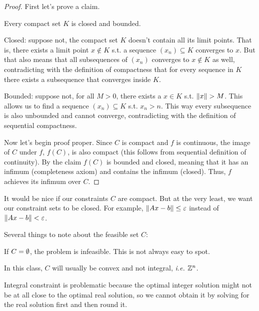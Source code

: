 \documentclass[class=article,crop=false]{standalone}
\begin{document}
\begin{proof}
	First let's prove a claim.
	\begin{claim}
		Every compact set $ K$ is closed and bounded. 
	\end{claim}

	Closed: suppose not, the compact set $ K$ doesn't contain all its limit points. That is, there exists a limit point $ x \not\in K$ s.t. a sequence  $ (x_n) \subseteq K$ converges to $ x$. But that also means that all subsequences of $ (x_n)$ converges to $ x \not\in K$ as well, contradicting with the definition of compactness that for every sequence in $ K$ there exists a subsequence that converges inside $ K$. 

	Bounded: suppose not, for all $ M > 0$, there exists a  $ x \in K$ s.t. $ {\left\lVert{ x}\right\rVert} > M $. This allows us to find a sequence $ (x_n) \subseteq K$ s.t. $ x_n > n$. This way every subsequence is also unbounded and cannot converge, contradicting with the definition of sequential compactness.
	
	Now let's begin proof proper. Since $ C$ is compact and  $ f$ is continuous, the image of  $ C$ under  $ f$,  $ f(C)$, is also compact (this follows from sequential definition of continuity). By the claim $f(C) $ is bounded and closed, meaning that it has an infimum (completeness axiom) and contains the infimum (closed). Thus, $ f$ achieves its infimum over $ C$.
\end{proof}
\begin{remark}
It would be nice if our constraints $ C$ are compact. But at the very least, we want our constraint sets to be closed. For example,  $ {\left\lVert{ Ax -b}\right\rVert} \leq \varepsilon $ instead of $ {\left\lVert{ Ax -b}\right\rVert} < \varepsilon $.
\end{remark}

Several things to note about the feasible set $ C$:

If $ C = \emptyset$, the problem is infeasible. This is not always easy to spot.

In this class, $ C$ will usually be convex and not integral,  \emph{i.e.} $ \mathbb{Z}^{n}$.

Integral constraint is problematic because the optimal integer solution might not be at all close to the optimal real solution, so we cannot obtain it by solving for the real solution first and then round it.
\end{document}
